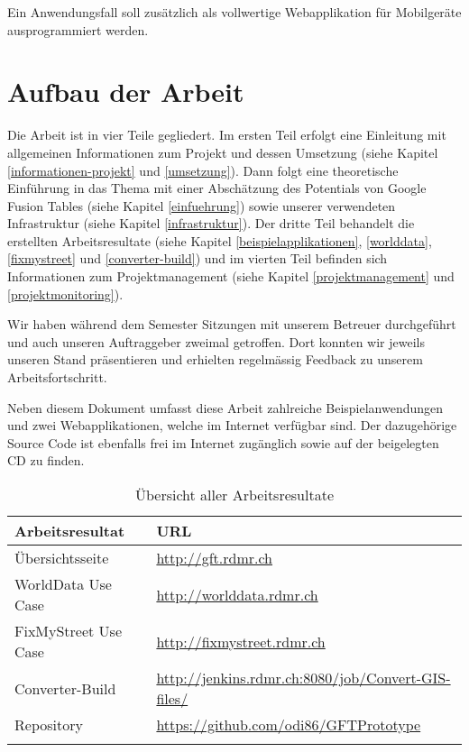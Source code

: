 Ein Anwendungsfall soll zusätzlich als vollwertige Webapplikation für Mobilgeräte ausprogrammiert werden.

\section{Aufbau der Arbeit}
Die Arbeit ist in vier Teile gegliedert. Im ersten Teil erfolgt eine Einleitung mit allgemeinen Informationen zum Projekt und dessen Umsetzung (siehe Kapitel \ref{informationen-projekt} und \ref{umsetzung}). Dann folgt eine theoretische Einführung in das Thema mit einer Abschätzung des Potentials von Google Fusion Tables (siehe Kapitel \ref{einfuehrung}) sowie unserer verwendeten Infrastruktur (siehe Kapitel \ref{infrastruktur}). Der dritte Teil behandelt die erstellten Arbeitsresultate (siehe Kapitel \ref{beispielapplikationen}, \ref{worlddata}, \ref{fixmystreet} und \ref{converter-build}) und im vierten Teil befinden sich Informationen zum Projektmanagement (siehe Kapitel \ref{projektmanagement} und \ref{projektmonitoring}).

Wir haben während dem Semester Sitzungen mit unserem Betreuer durchgeführt und auch unseren Auftraggeber zweimal getroffen. Dort konnten wir jeweils unseren Stand präsentieren und erhielten regelmässig Feedback zu unserem Arbeitsfortschritt.

Neben diesem Dokument umfasst diese Arbeit zahlreiche Beispielanwendungen und zwei Webapplikationen, welche im Internet verfügbar sind. Der dazugehörige Source Code ist ebenfalls frei im Internet zugänglich sowie auf der beigelegten CD zu finden.

\begin{longtable}{|l|l|}
\hline 
\textbf{Arbeitsresultat} & \textbf{URL} \\ 
\hline 
Übersichtsseite & \url{http://gft.rdmr.ch} \\ 
\hline 
WorldData Use Case & \url{http://worlddata.rdmr.ch} \\ 
\hline 
FixMyStreet Use Case & \url{http://fixmystreet.rdmr.ch} \\ 
\hline 
Converter-Build & \url{http://jenkins.rdmr.ch:8080/job/Convert-GIS-files/} \\ 
\hline 
Repository & \url{https://github.com/odi86/GFTPrototype} \\ 
\hline 
\caption{Übersicht aller Arbeitsresultate}
\label{arbeitsresultate}
\end{longtable} 